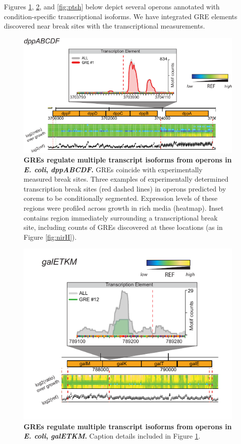 Figures \ref{fig:dpp_ecoli_expression}, \ref{fig:galE}, and
\ref{fig:ptsh} below depict several operons annotated with
condition-specific transcriptional isoforms. We have integrated GRE
elements discovered near break sites with the transcriptional
measurements.

\begin{figure}[hp]
\centering
\includegraphics[width=0.7\linewidth]{figures/dpp_ecoli_expression.pdf}
\caption[GREs regulate multiple transcript isoforms from operons in
  {\it E. coli}, \textit{dppABCDF}]{\textbf{GREs regulate multiple
    transcript isoforms from operons in {\it E. coli},
    \textit{dppABCDF}.} GREs coincide with experimentally measured
  break sites. Three examples of experimentally determined
  transcription break sites (red dashed lines) in operons predicted by
  corems to be conditionally segmented. Expression levels of these
  regions were profiled across growth in rich media (heatmap). Inset
  contains region immediately surrounding a transcriptional break
  site, including counts of GREs discovered at these locations (as in
  Figure \ref{fig:nirH}).}
\label{fig:dpp_ecoli_expression}
\end{figure}

\begin{figure}[hp]
\centering
\includegraphics[width=0.7\linewidth]{figures/galE.pdf}
\caption[GREs regulate multiple transcript isoforms from operons in
  {\it E. coli}, \textit{galETKM}]{\textbf{GREs regulate multiple
    transcript isoforms from operons in {\it E. coli},
    \textit{galETKM}.} Caption details included in Figure
  \ref{fig:dpp_ecoli_expression}.}
\label{fig:galE}
\end{figure}

